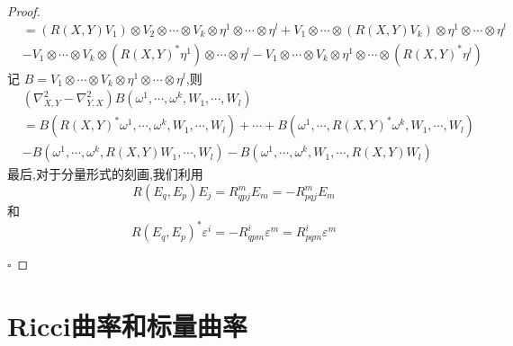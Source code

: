 \documentclass[../../几何与拓扑.tex]{subfiles}
\begin{document}
\begin{proof}
\[\begin{aligned}
     & = \left( R\left( X,Y \right)V_1  \right)\otimes V_2\otimes \cdots \otimes V_{k}\otimes \eta ^{1}\otimes \cdots \otimes \eta ^{l}+ V_1\otimes \cdots \otimes \left( R\left( X,Y \right)V_{k}  \right)\otimes \eta ^{1}\otimes \cdots \otimes \eta ^{l}\\ 
      & -V_1\otimes \cdots \otimes V_{k}\otimes \left( R\left( X,Y \right)^{*}\eta ^{1}  \right)\otimes \cdots \otimes \eta ^{l}-V_1\otimes \cdots \otimes V_{k}\otimes \eta ^{1}\otimes \cdots \otimes \left( R\left( X,Y \right)^{*}\eta ^{l}  \right)  
    \end{aligned}
    \]记 \(  B= V_1\otimes \cdots \otimes V_{k}\otimes \eta ^{1}\otimes \cdots \otimes \eta ^{l}  \),则 \[
    \begin{aligned}
   &  \left(  \nabla _{X,Y}^{2}- \nabla _{Y,X}^{2} \right)B\left(  \omega^1,\cdots,\omega^k , W_1,\cdots,W_l  \right)   \\ 
     & = B\left( R\left( X,Y \right)^{*} \omega ^{1},\cdots , \omega ^{k}, W_1,\cdots,W_l   \right)+ \cdots + B\left(  \omega ^{1},\cdots ,R\left( X,Y \right)^{*} \omega ^{k}, W_1,\cdots,W_l   \right)\\ 
      & -B\left(  \omega^1,\cdots,\omega^k ,R\left( X,Y \right)W_1,\cdots,W _{l}  \right)   -B\left(  \omega^1,\cdots,\omega^k ,W_1,\cdots ,R\left( X,Y \right)W_{l}  \right) 
    \end{aligned}
    \] 最后,对于分量形式的刻画,我们利用 \[
    R\left( E_{q},E_{p} \right)E_{j}= R_{qpj}^{m}E_{m}= -R_{pqj}^{m}E_{m} 
    \]和 \[
    R\left( E_{q},E_{p} \right)^{*} \varepsilon ^{i} = -R_{qpm}^{i} \varepsilon ^{m} =  R_{pqm}^{i} \varepsilon ^{m}
    \]

    \hfill $\square$
\end{proof}


\section{Ricci曲率和标量曲率}
\end{document}
